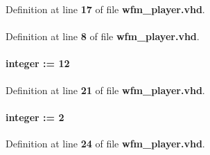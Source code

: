 Definition at line {\bf 17} of file {\bf wfm\+\_\+player.\+vhd}.

\paragraph[{ieee}]{\hspace{0.3cm}{\ttfamily [Library]}}\label{classwfm__player_a0a6af6eef40212dbaf130d57ce711256}


Definition at line {\bf 8} of file {\bf wfm\+\_\+player.\+vhd}.

\paragraph[{iq\+\_\+width}]{ {\bfseries \textcolor{vhdlchar}{ }} {\bfseries \textcolor{comment}{integer}\textcolor{vhdlchar}{ }\textcolor{vhdlchar}{ }\textcolor{vhdlchar}{\+:}\textcolor{vhdlchar}{=}\textcolor{vhdlchar}{ }\textcolor{vhdlchar}{ } \textcolor{vhdldigit}{12} \textcolor{vhdlchar}{ }} \hspace{0.3cm}{\ttfamily [Generic]}}\label{classwfm__player_ad9eb9b875b008b241e3b7e7c8ff4b62a}


Definition at line {\bf 21} of file {\bf wfm\+\_\+player.\+vhd}.

\paragraph[{lcl\+\_\+burst\+\_\+length}]{ {\bfseries \textcolor{vhdlchar}{ }} {\bfseries \textcolor{comment}{integer}\textcolor{vhdlchar}{ }\textcolor{vhdlchar}{ }\textcolor{vhdlchar}{\+:}\textcolor{vhdlchar}{=}\textcolor{vhdlchar}{ }\textcolor{vhdlchar}{ } \textcolor{vhdldigit}{2} \textcolor{vhdlchar}{ }} \hspace{0.3cm}{\ttfamily [Generic]}}\label{classwfm__player_a7610e5027e0ddffd8d66d7be922dec51}


Definition at line {\bf 24} of file {\bf wfm\+\_\+player.\+vhd}.

